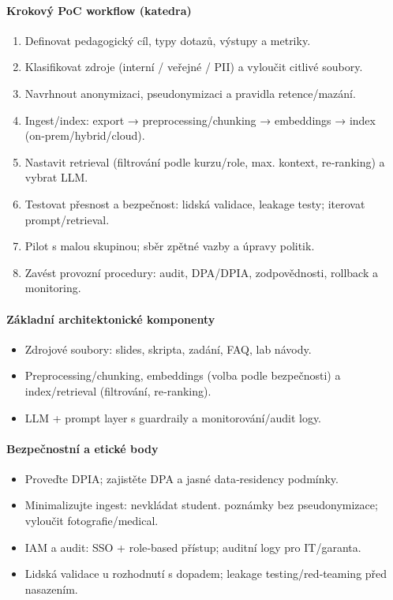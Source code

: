 \documentclass{report}%
\begin{document}
\paragraph{Krokový PoC workflow (katedra)} \begin{enumerate}
  \item Definovat pedagogický cíl, typy dotazů, výstupy a metriky.
  \item Klasifikovat zdroje (interní / veřejné / PII) a vyloučit citlivé soubory.
  \item Navrhnout anonymizaci, pseudonymizaci a pravidla retence/mazání.
  \item Ingest/index: export → preprocessing/chunking → embeddings → index (on‑prem/hybrid/cloud).
  \item Nastavit retrieval (filtrování podle kurzu/role, max. kontext, re‑ranking) a vybrat LLM.
  \item Testovat přesnost a bezpečnost: lidská validace, leakage testy; iterovat prompt/retrieval.
  \item Pilot s malou skupinou; sběr zpětné vazby a úpravy politik.
  \item Zavést provozní procedury: audit, DPA/DPIA, zodpovědnosti, rollback a monitoring.
\end{enumerate}

\paragraph{Základní architektonické komponenty} \begin{itemize}
  \item Zdrojové soubory: slides, skripta, zadání, FAQ, lab návody.
  \item Preprocessing/chunking, embeddings (volba podle bezpečnosti) a index/retrieval (filtrování, re‑ranking).
  \item LLM + prompt layer s guardraily a monitorování/audit logy.
\end{itemize}

\paragraph{Bezpečnostní a etické body} \begin{itemize}
  \item Proveďte DPIA; zajistěte DPA a jasné data‑residency podmínky.
  \item Minimalizujte ingest: nevkládat student. poznámky bez pseudonymizace; vyloučit fotografie/medical.
  \item IAM a audit: SSO + role‑based přístup; auditní logy pro IT/garanta.
  \item Lidská validace u rozhodnutí s dopadem; leakage testing/red‑teaming před nasazením.
\end{itemize}
\end{document}
